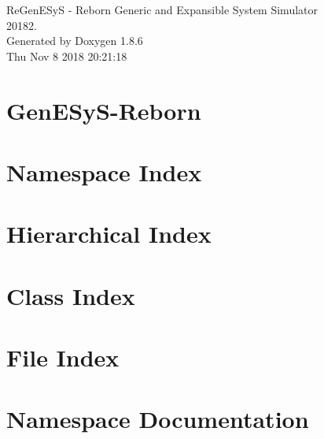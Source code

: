 \documentclass[twoside]{book}
\newcommand{\clearemptydoublepage}{%
  \newpage{\pagestyle{empty}\cleardoublepage}%
}
\begin{document}
\hypersetup{pageanchor=false}
\begin{titlepage}
\vspace*{7cm}
\begin{center}%
{\Large Re\-Gen\-E\-Sy\-S -\/ Reborn Generic and Expansible System Simulator \\[1ex]\large 20182. }\\
\vspace*{1cm}
{\large Generated by Doxygen 1.8.6}\\
\vspace*{0.5cm}
{\small Thu Nov 8 2018 20:21:18}\\
\end{center}
\end{titlepage}
\clearemptydoublepage
\tableofcontents
\clearemptydoublepage
{}
\hypersetup{pageanchor=true}

\chapter{Gen\-E\-Sy\-S-\/\-Reborn}
\label{md__r_e_a_d_m_e}
\hypertarget{md__r_e_a_d_m_e}{}

\chapter{Namespace Index}

\chapter{Hierarchical Index}

\chapter{Class Index}

\chapter{File Index}

\chapter{Namespace Documentation}

\end{document}

